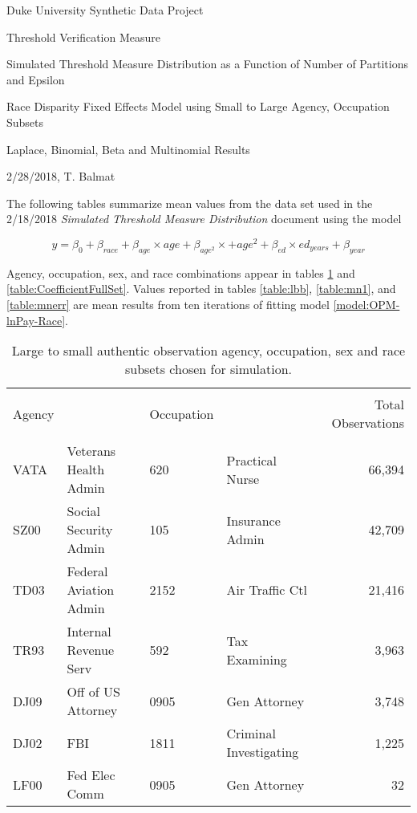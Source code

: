 \documentclass[10pt, letterpaper]{article}
\begin{document}
\begin{spacing}{1.0}

Duke University Synthetic Data Project
    
Threshold Verification Measure

Simulated Threshold Measure Distribution as a Function of Number of Partitions and Epsilon

Race Disparity Fixed Effects Model using Small to Large Agency, Occupation Subsets

Laplace, Binomial, Beta and Multinomial Results

2/28/2018, T. Balmat

\vspace{20pt}

The following tables summarize mean values from the data set used in the 2/18/2018 \textit{Simulated Threshold Measure Distribution} document using the model

\vspace{-24pt}
\begin{center}
    \begin{equation}
    y=\beta_0 + \beta_{race} + \beta_{age} \times age + \beta_{age^2} \times + age^2 + \beta_{ed} \times ed_{years} + \beta_{year}
    \label{model:OPM-lnPay-Race}
    \end{equation}
\end{center}

Agency, occupation, sex, and race combinations appear in tables \ref{table:AgencyOcc} and \ref{table:CoefficientFullSet}.  Values reported in tables \ref{table:lbb}, \ref{table:mn1}, and \ref{table:mnerr} are mean results from ten iterations of fitting model \ref{model:OPM-lnPay-Race}.

\vspace{20pt}

\begin{table}[h]
    \centering
    \caption{Large to small authentic observation agency, occupation, sex and race subsets chosen for simulation.}
    \begin{tabular}{llllr}
      \hline\\[-10pt]
      Agency & & Occupation & & Total Observations \\ 
      \hline\\[-6pt]
      VATA & Veterans Health Admin & 620 & Practical Nurse & 66,394 \\
      SZ00 & Social Security Admin & 105 & Insurance Admin & 42,709 \\
      TD03 & Federal Aviation Admin & 2152 & Air Traffic Ctl & 21,416 \\
      TR93 & Internal Revenue Serv & 592 & Tax Examining & 3,963 \\ 
      DJ09 & Off of US Attorney & 0905 & Gen Attorney & 3,748 \\
      DJ02 & FBI & 1811 & Criminal Investigating & 1,225 \\
      LF00 & Fed Elec Comm & 0905 & Gen Attorney & 32 \\
      \hline
    \end{tabular}
    \label{table:AgencyOcc}
\end{table}


\end{spacing}
\end{document}
